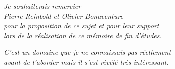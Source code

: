 \pagestyle{empty} %

\cleardoublepage

\null\vfill %

\begin{flushright}
\emph{Je souhaiterais remercier\\Pierre Reinbold et Olivier Bonaventure\\pour la proposition de ce sujet et pour leur support\\lors de la réalisation de ce mémoire de fin d'études.}
\end{flushright}

\begin{flushright}
\emph{C'est un domaine que je ne connaissais pas réellement\\avant de l'aborder mais il s'est révélé très intéressant.}
\end{flushright}

\vfill\vfill\vfill\vfill\vfill\null %

\cleardoublepage
